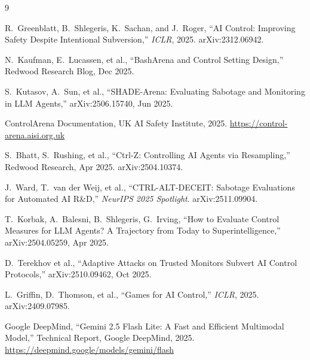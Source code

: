 \documentclass[10pt,twocolumn]{article}
\begin{document}
\begin{thebibliography}{9}

R.~Greenblatt, B.~Shlegeris, K.~Sachan, and J.~Roger,
``AI Control: Improving Safety Despite Intentional Subversion,''
\emph{ICLR}, 2025. arXiv:2312.06942.

N.~Kaufman, E.~Lucassen, et al.,
``BashArena and Control Setting Design,''
Redwood Research Blog, Dec 2025.

S.~Kutasov, A.~Sun, et al.,
``SHADE-Arena: Evaluating Sabotage and Monitoring in LLM Agents,''
arXiv:2506.15740, Jun 2025.

ControlArena Documentation,
UK AI Safety Institute, 2025.
\url{https://control-arena.aisi.org.uk}

S.~Bhatt, S.~Rushing, et al.,
``Ctrl-Z: Controlling AI Agents via Resampling,''
Redwood Research, Apr 2025. arXiv:2504.10374.

J.~Ward, T.~van der Weij, et al.,
``CTRL-ALT-DECEIT: Sabotage Evaluations for Automated AI R\&D,''
\emph{NeurIPS 2025 Spotlight}. arXiv:2511.09904.

T.~Korbak, A.~Balesni, B.~Shlegeris, G.~Irving,
``How to Evaluate Control Measures for LLM Agents? A Trajectory from Today to Superintelligence,''
arXiv:2504.05259, Apr 2025.

D.~Terekhov et al.,
``Adaptive Attacks on Trusted Monitors Subvert AI Control Protocols,''
arXiv:2510.09462, Oct 2025.

L.~Griffin, D.~Thomson, et al.,
``Games for AI Control,''
\emph{ICLR}, 2025. arXiv:2409.07985.

Google DeepMind,
``Gemini 2.5 Flash Lite: A Fast and Efficient Multimodal Model,''
Technical Report, Google DeepMind, 2025.
\url{https://deepmind.google/models/gemini/flash}

\end{thebibliography}
\end{document}

